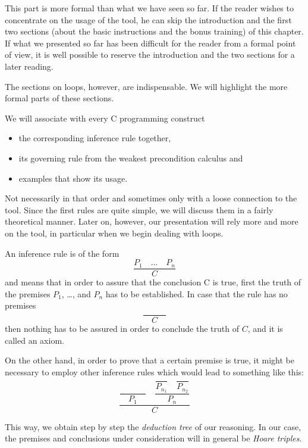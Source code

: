 \begin{Information}
  This part is more formal than what we have seen so far. If the reader
  wishes to concentrate on the usage of the tool, he can skip the
  introduction and the first two sections (about the basic instructions
  and the bonus training) of this chapter. If what we presented so far has
  been difficult for the reader from a formal point of view,
  it is well possible to reserve the introduction and the two
  sections for a later reading.

  The sections on loops, however, are indispensable. We will highlight
  the more formal parts of these sections.
\end{Information}


We will associate with every C programming construct

\begin{itemize}
\item the corresponding inference rule together,
\item its governing rule from the weakest precondition calculus and
\item examples that show its usage.
\end{itemize}

Not necessarily in that order and sometimes only with a loose connection
to the tool. Since the first rules are quite simple, we will discuss
them in a fairly theoretical manner. Later on, however, our presentation
will rely more and more on the tool, in particular when we begin dealing
with loops.





An inference rule is of the form
$$\dfrac{P_1 \quad ... \quad P_n}{C}$$
and means that in order to assure that the conclusion C is true, first
the truth of the premises $P_1$, \ldots{}, and $P_n$ has to be
established. In case that the rule has no premises
$$\dfrac{}{\quad C \quad}$$
then nothing has to be assured in order to conclude the truth of $C$,
and it is called an axiom.

On the other hand, in order to prove that a certain premise is true, it
might be necessary to employ other inference rules which would lead to
something like this:
$$\dfrac{\dfrac{}{\quad P_1\quad} \quad \dfrac{\dfrac{}{P_{n_1}}\quad \dfrac{}{P_{n_2}}}{P_n}}{C}$$

This way, we obtain step by step the \emph{deduction tree} of our
reasoning. In our case, the premises and conclusions under consideration
will in general be \emph{Hoare triples}.



